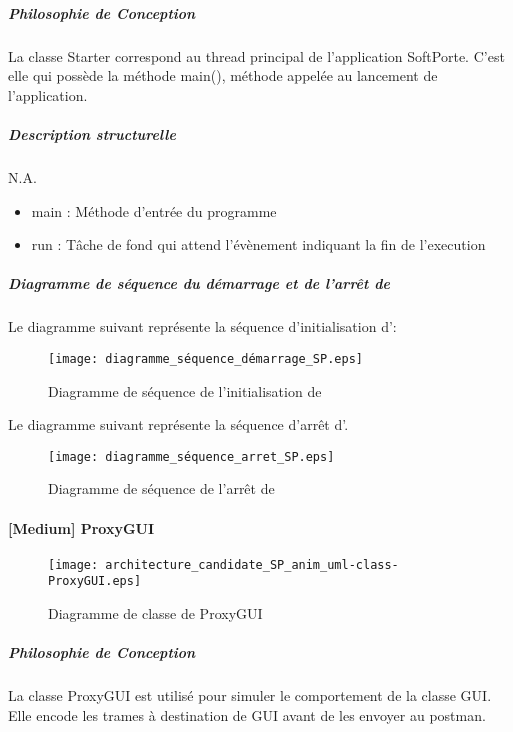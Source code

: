        \subparagraph{Philosophie de Conception}%
        La classe Starter correspond au thread principal de l'application SoftPorte.
        C'est elle qui possède la méthode main(), méthode appelée au lancement de l'application.
        \subparagraph{Description structurelle}%
        N.A.
        \begin{itemize}
            \item {main : Méthode d'entrée du programme}
            \item {run : Tâche de fond qui attend l'évènement indiquant la fin de l'execution}
        \end{itemize}
        
\newpage

        \subparagraph{Diagramme de séquence du démarrage et de l'arrêt de \appliPo}%
        Le diagramme suivant représente la séquence d'initialisation d'\appliPo :
        \begin{figure} [H]
            \centering
            \texttt{[image: diagramme\_séquence\_démarrage\_SP.eps]}
            \caption{Diagramme de séquence de l'initialisation de \appliPo}
            \label{Seq-Init-SP}
        \end{figure}
    
        Le diagramme suivant représente la séquence d'arrêt d'\appliA.
        \begin{figure} [H]
            \centering
            \texttt{[image: diagramme\_séquence\_arret\_SP.eps]}
            \caption{Diagramme de séquence de l'arrêt de \appliPo}
            \label{Seq-Arret-SP}
        \end{figure}

\newpage
    
        \paragraph{[Medium] ProxyGUI}%

        \begin{figure} [H]
            \centering
            \texttt{[image: architecture\_candidate\_SP\_anim\_uml-class-ProxyGUI.eps]}
            \caption{Diagramme de classe de ProxyGUI}
            \label{Class-ProxyGUI}
            \end{figure}
        \subparagraph{Philosophie de Conception}%
        La classe ProxyGUI est utilisé pour simuler le comportement de la classe GUI.
        Elle encode les trames à destination de GUI avant de les envoyer au postman.
        
